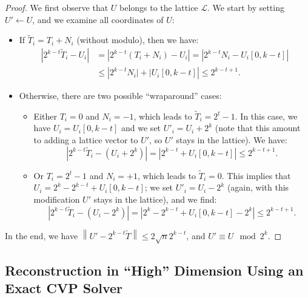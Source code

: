 \documentclass[submission,svgnames,journal=tosc]{iacrtrans}
\begin{document}
\begin{proof}
  We first observe that $U$ belongs to the lattice $\mathcal{L}$. We start by setting $U' \gets U$, and we examine all coordinates of $U$:
  \begin{itemize}
  \item If $\widetilde{T}_i = T_i + N_i$ (without modulo), then we have:
    \begin{align*}
      \left| 2^{k-t}\widetilde{T}_i-U_i \right| &= \left| 2^{k-t}(T_i + N_i)-U_i \right| 
                                                     = \left| 2^{k-t}N_i - U_i[0,k-t] \right| \\
                                                   &\leq \left| 2^{k-t}N_i\rvert + \lvert U_i[0,k-t] \right| 
      \leq 2^{k-t +1 }.
    \end{align*}
    
  \item Otherwise, there are two possible ``wraparound'' cases:
    \begin{itemize}
    \item Either $T_i = 0$ and $N_i = -1$, which leads to $\widetilde{T}_i = 2^t-1$. 
      In this case, we have $U_i = U_i[0,k-t]$ and we set $U'_i = U_i + 2^{k}$ (note that this amount to adding a lattice vector to $U'$, so $U'$ stays in the lattice). We have:
      \[
        \left| 2^{k-t}\widetilde{T}_i-(U_i + 2^k) \right| = %
        \left| 2^{k-t} + U_i[0,k-t]\right| \leq 2^{k-t + 1}. 
      \]
      
    \item Or $T_i = 2^{t}-1$ and $N_i = +1$, which leads to
      $\widetilde{T}_i = 0$.  This implies that
      $U_i= 2^k-2^{k-t} + U_i[0,k-t]$; we set $U'_i = U_i - 2^k$ (again,
      with this modification $U'$ stays in the lattice), and we find:
      \[
        \left| 2^{k-t}\widetilde{T}_i-(U_i - 2^k) \right| %
        = \left| 2^k-2^{k-t} + U_i[0,k-t] - 2^k\right| \leq 2^{k-t + 1}.
      \]
    \end{itemize}
  \end{itemize}
  In the end, we have
  $\left\| U' -2^{k-t} \widetilde{T} \right\| \leq 2 \sqrt{n} 2^{k-t}$,
  and $U' \equiv U \mod 2^k $.
\end{proof}

\subsection{Reconstruction in ``High'' Dimension Using an Exact CVP Solver}
\label{sec:cvp_big}
\end{document}
